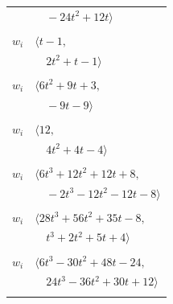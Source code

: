 \documentclass[11pt]{article}
\begin{document}
\begin{longtable}{@{}ll@{}}
 & $\quad -24t^{2}+12t\rangle$\\
\addlinespace[2pt]
\multicolumn{2}{@{}p{0.97\textwidth}@{}}{$i=25$, $D_i=1$, $\rho_{ij}$: $15{:}3, \allowbreak 32{:}1, \allowbreak 36{:}2, \allowbreak 41{:}1, \allowbreak 44{:}3$}\\
$w_i$ & $\langle t-1,$\\
 & $\quad 2t^{2}+t-1\rangle$\\
\addlinespace[2pt]
\multicolumn{2}{@{}p{0.97\textwidth}@{}}{$i=26$, $D_i=1$, $\rho_{ij}$: $1{:}2, \allowbreak 4{:}1, \allowbreak 13{:}1, \allowbreak 15{:}3, \allowbreak 33{:}1, \allowbreak 41{:}1, \allowbreak 42{:}1, \allowbreak 44{:}1$}\\
$w_i$ & $\langle 6t^{2}+9t+3,$\\
 & $\quad -9t-9\rangle$\\
\addlinespace[2pt]
\multicolumn{2}{@{}p{0.97\textwidth}@{}}{$i=27$, $D_i=1$, $\rho_{ij}$: $11{:}3, \allowbreak 28{:}1, \allowbreak 30{:}3, \allowbreak 31{:}1, \allowbreak 40{:}1, \allowbreak 43{:}1, \allowbreak 45{:}1$}\\
$w_i$ & $\langle 12,$\\
 & $\quad 4t^{2}+4t-4\rangle$\\
\addlinespace[2pt]
\multicolumn{2}{@{}p{0.97\textwidth}@{}}{$i=28$, $D_i=1$, $\rho_{ij}$: $11{:}2, \allowbreak 14{:}3, \allowbreak 20{:}3, \allowbreak 22{:}3, \allowbreak 27{:}3, \allowbreak 39{:}3, \allowbreak 46{:}1$}\\
$w_i$ & $\langle 6t^{3}+12t^{2}+12t+8,$\\
 & $\quad -2t^{3}-12t^{2}-12t-8\rangle$\\
\addlinespace[2pt]
\multicolumn{2}{@{}p{0.97\textwidth}@{}}{$i=29$, $D_i=1$, $\rho_{ij}$: $9{:}2, \allowbreak 16{:}3, \allowbreak 23{:}3, \allowbreak 34{:}3, \allowbreak 41{:}2$}\\
$w_i$ & $\langle 28t^{3}+56t^{2}+35t-8,$\\
 & $\quad t^{3}+2t^{2}+5t+4\rangle$\\
\addlinespace[2pt]
\multicolumn{2}{@{}p{0.97\textwidth}@{}}{$i=30$, $D_i=1$, $\rho_{ij}$: $5{:}1, \allowbreak 13{:}1, \allowbreak 14{:}1, \allowbreak 15{:}3, \allowbreak 27{:}1, \allowbreak 40{:}3, \allowbreak 43{:}3$}\\
$w_i$ & $\langle 6t^{3}-30t^{2}+48t-24,$\\
 & $\quad 24t^{3}-36t^{2}+30t+12\rangle$\\
\addlinespace[2pt]
\multicolumn{2}{@{}p{0.97\textwidth}@{}}{$i=31$, $D_i=1$, $\rho_{ij}$: $8{:}3, \allowbreak 11{:}2, \allowbreak 16{:}1, \allowbreak 27{:}3, \allowbreak 39{:}2$}\\

\end{longtable}
\end{document}
